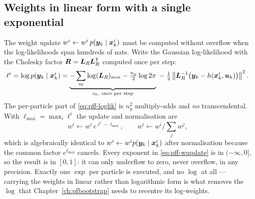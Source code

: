 \subsection{Weights in linear form with a single exponential}
The weight update $w^i \leftarrow w^i\, p(\bm{y}_k\mid\bm{x}_k^i)$ must be computed without overflow when
the log-likelihoods span hundreds of nats.  Write the Gaussian log-likelihood with the Cholesky
factor $\bm{R} = \bm{L}_R\bm{L}_R^{\mathsf{T}}$ computed once per step:
\begin{equation}
  \ell^i = \log p(\bm{y}_k\mid\bm{x}_k^i)
         = \underbrace{-\sum_{m}\log (\bm{L}_R)_{mm} - \tfrac{n_y}{2}\log 2\pi}_{c_0,\ \text{once per step}}
           \;-\; \tfrac12 \left\lVert \bm{L}_R^{-1}\big(\bm{y}_k - h(\bm{x}_k^i,\bm{u}_k)\big) \right\rVert^2 .
  \label{eq:pff-loglik}
\end{equation}
The per-particle part of \eqref{eq:pff-loglik} is $n_y^2$ multiply-adds and \emph{no}
transcendental.  With $\ell_{\max} = \max_i \ell^i$ the update and normalisation are
\begin{equation}
  w^i \leftarrow w^i\, e^{\ell^i - \ell_{\max}}, \qquad
  w^i \leftarrow w^i \Big/ \sum_j w^j ,
  \label{eq:pff-wupdate}
\end{equation}
which is algebraically identical to $w^i \leftarrow w^i p(\bm{y}_k\mid\bm{x}_k^i)$ after normalisation
because the common factor $e^{\ell_{\max}}$ cancels.  Every exponent in \eqref{eq:pff-wupdate} is
in $(-\infty, 0]$, so the result is in $[0,1]$: it can only underflow to zero, never overflow, in
any precision.  Exactly one $\exp$ per particle is executed, and no $\log$ at all --- carrying the
weights in linear rather than logarithmic form is what removes the $\log$ that
Chapter~\ref{ch:pfbootstrap} needs to recentre its log-weights.

